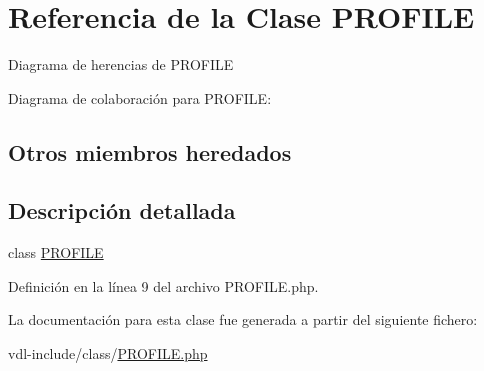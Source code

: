 \hypertarget{classPROFILE}{\section{Referencia de la Clase P\-R\-O\-F\-I\-L\-E}
\label{classPROFILE}
}


Diagrama de herencias de P\-R\-O\-F\-I\-L\-E


Diagrama de colaboración para P\-R\-O\-F\-I\-L\-E\-:
\subsection*{Otros miembros heredados}


\subsection{Descripción detallada}
class \hyperlink{classPROFILE}{P\-R\-O\-F\-I\-L\-E} 

Definición en la línea 9 del archivo P\-R\-O\-F\-I\-L\-E.\-php.



La documentación para esta clase fue generada a partir del siguiente fichero\-:\begin{DoxyCompactItemize}
\item 
vdl-\/include/class/\hyperlink{PROFILE_8php}{P\-R\-O\-F\-I\-L\-E.\-php}\end{DoxyCompactItemize}
